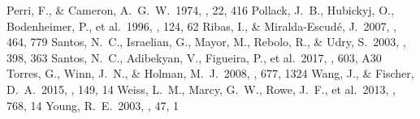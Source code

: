 \documentclass[twocolumn, dvipdfmx]{aastex62}
\begin{document}
\begin{CJK*}{UTF8}{min}
\begin{thebibliography}{}
 Perri, F., \& Cameron, A.~G.~W.\ 1974, \icarus, 22, 416
 Pollack, J.~B., Hubickyj, O., Bodenheimer, P., et al.\ 1996, \icarus, 124, 62
 Ribas, I., \& Miralda-Escud{\'e}, J.\ 2007, \aap, 464, 779
 Santos, N.~C., Israelian, G., Mayor, M., Rebolo, R., \& Udry, S.\ 2003, \aap, 398, 363
 Santos, N.~C., Adibekyan, V., Figueira, P., et al.\ 2017, \aap, 603, A30
 Torres, G., Winn, J.~N., \& Holman, M.~J.\ 2008, \apj, 677, 1324
 Wang, J., \& Fischer, D.~A.\ 2015, \aj, 149, 14
 Weiss, L.~M., Marcy, G.~W., Rowe, J.~F., et al.\ 2013, \apj, 768, 14
 Young, R.~E.\ 2003, \nar, 47, 1

\end{thebibliography}


\end{CJK*}
\end{document}
